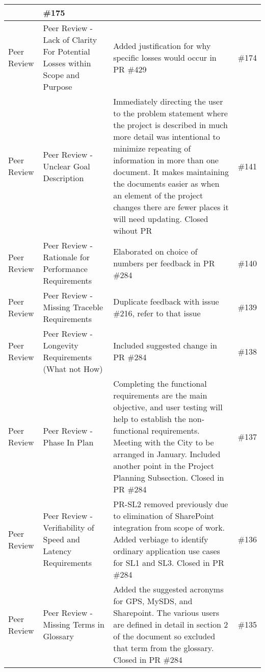\documentclass{article}
\begin{document}
\begin{longtable}{|m{3cm}|m{3cm}|m{5cm}|m{1cm}|}
 & \#175 \\
 \hline
 Peer Review & Peer Review - Lack of Clarity For Potential Losses within Scope and Purpose & Added justification for why specific losses 
 would occur in PR \#429 & \#174\\
 \hline
 Peer Review & Peer Review - Unclear Goal Description & Immediately directing the user to the problem statement where the project is described in much 
 more detail was intentional to minimize repeating of information in more than one document. 
 It makes maintaining the documents easier as when an element of the project changes there are fewer places it will need updating. Closed wihout PR
 & \#141\\
 \hline
 Peer Review & Peer Review - Rationale for Performance Requirements & Elaborated on choice of numbers per feedback in PR \#284 & \#140\\
 \hline
 Peer Review & Peer Review - Missing Traceble Requirements & Duplicate feedback with issue \#216, refer to that issue & \#139\\
 \hline
 Peer Review & Peer Review - Longevity Requirements (What not How) & Included suggested change in PR \#284 & \#138\\
 \hline
 Peer Review & Peer Review - Phase In Plan & Completing the functional requirements are the main objective, and user testing will help to establish the non-functional requirements. 
 Meeting with the City to be arranged in January. Included another point in the Project Planning Subsection. Closed in PR \#284 & \#137\\
 \hline
 Peer Review & Peer Review - Verifiability of Speed and Latency Requirements & PR-SL2 removed previously due to elimination of SharePoint integration from scope of work.
 Added verbiage to identify ordinary application use cases for SL1 and SL3. Closed in PR \#284 & \#136 \\
 \hline
 Peer Review & Peer Review - Missing Terms in Glossary & Added the suggested acronyms for GPS, MySDS, and Sharepoint. 
 The various users are defined in detail in section 2 of the document so excluded that term from the glossary. Closed in PR \#284
 & \#135\\
 \hline
\end{longtable}
\end{document}
